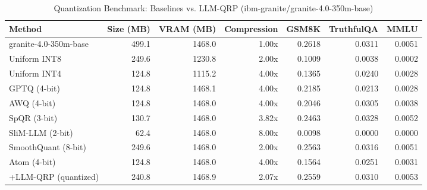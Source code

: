 \begin{table}[htbp]
  \centering
  \small
  \caption{Quantization Benchmark: Baselines vs. LLM-QRP (ibm-granite/granite-4.0-350m-base)}
  \label{tab:benchmark}
  \begin{tabular}{lrrrrrr}
    \toprule
    \textbf{Method} & \textbf{Size (MB)} & \textbf{VRAM (MB)} & \textbf{Compression} & \textbf{GSM8K} & \textbf{TruthfulQA} & \textbf{MMLU} \\
    \midrule
    granite-4.0-350m-base & 499.1 & 1468.0 & 1.00x & 0.2618 & 0.0311 & 0.0051 \\
    Uniform INT8 & 249.6 & 1230.8 & 2.00x & 0.1009 & 0.0038 & 0.0002 \\
    Uniform INT4 & 124.8 & 1115.2 & 4.00x & 0.1365 & 0.0240 & 0.0028 \\
    GPTQ (4-bit) & 124.8 & 1468.1 & 4.00x & 0.2185 & 0.0213 & 0.0028 \\
    AWQ (4-bit) & 124.8 & 1468.0 & 4.00x & 0.2046 & 0.0305 & 0.0038 \\
    SpQR (3-bit) & 130.7 & 1468.0 & 3.82x & 0.2463 & 0.0328 & 0.0052 \\
    SliM-LLM (2-bit) & 62.4 & 1468.0 & 8.00x & 0.0098 & 0.0000 & 0.0000 \\
    SmoothQuant (8-bit) & 249.6 & 1468.0 & 2.00x & 0.2563 & 0.0316 & 0.0051 \\
    Atom (4-bit) & 124.8 & 1468.0 & 4.00x & 0.1564 & 0.0251 & 0.0031 \\
    \midrule
    +LLM-QRP (quantized) & 240.8 & 1468.9 & 2.07x & 0.2559 & 0.0310 & 0.0053 \\
    \bottomrule
  \end{tabular}
\end{table}

